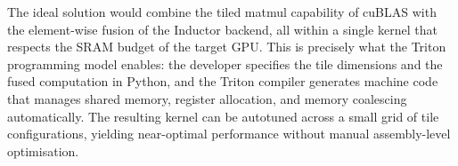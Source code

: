 The ideal solution would combine the tiled matmul capability of cuBLAS with the element-wise fusion of the Inductor backend, all within a single kernel that respects the SRAM budget of the target GPU. This is precisely what the Triton programming model enables: the developer specifies the tile dimensions and the fused computation in Python, and the Triton compiler generates machine code that manages shared memory, register allocation, and memory coalescing automatically. The resulting kernel can be autotuned across a small grid of tile configurations, yielding near-optimal performance without manual assembly-level optimisation.
